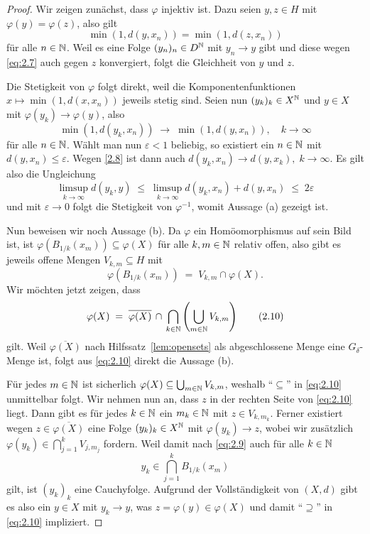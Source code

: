 \documentclass[../main/main.tex]{subfiles}
\begin{document}
	\begin{proof}
		Wir zeigen zunächst, dass $\varphi$ injektiv ist. 
		Dazu seien $y, z \in H$ mit $\varphi(y) = \varphi(z)$, also gilt
		\[\min(1, d(y, x_n)) = \min(1, d(z, x_n)) \label{eq:2.7} \tag{2.7}\]
		für alle $n \in \mathbb{N}$. Weil es eine Folge $(y_n)_n \in D^{\mathbb{N}}$ mit 
		$y_n \to y$ gibt und diese wegen \eqref{eq:2.7} auch gegen $z$ 
		konvergiert, folgt die Gleichheit von $y$ und $z$.
		
		Die Stetigkeit von $\varphi$ folgt direkt, weil die 
		Komponentenfunktionen $x \mapsto \min(1, d(x, x_n))$ jeweils stetig sind. 
		Seien nun $(y_k)_k \in X^{\mathbb{N}}$ und $y \in X$ mit $\varphi(y_k) \to \varphi(y)$, 
		also
		\[\min(1, d(y_k, x_n)) \; \to \; \min(1, d(y, x_n)), 
		\quad k \to \infty \label{2.8} \tag{2.8}\]
		für alle $n \in \mathbb{N}$. Wählt man nun $\varepsilon < 1$ beliebig, 
		so existiert ein $n \in \mathbb{N}$ mit $d(y, x_n) \leq \varepsilon$. 
		Wegen \eqref{2.8} ist dann auch
		$d(y_k, x_n) \to d(y, x_k), \; k \to \infty$. Es gilt also die Ungleichung
		$$\limsup_{k \to \infty} d(y_k, y) \; \leq \; 
		\limsup_{k \to \infty} d(y_k, x_n) + d(y, x_n) \; \leq \; 2\varepsilon$$
		und mit $\varepsilon \to 0$ folgt die Stetigkeit von $\varphi^{-1}$, 
		womit Aussage (a) gezeigt ist.
		
		Nun beweisen wir noch Aussage (b). Da $\varphi$ ein Homöomorphismus auf sein 
		Bild ist, ist $\varphi(B_{1/k}(x_m)) \subseteq \varphi(X)$ für alle 
		$k, m \in \mathbb{N}$ relativ offen, also gibt es jeweils offene Mengen 
		$V_{k, m} \subseteq H$ mit
		\[\varphi(B_{1/k}(x_m)) \; = \; V_{k, m} 
		\cap \varphi(X) \text{.} \label{eq:2.9} \tag{2.9}\]
		Wir möchten jetzt zeigen, dass
		\[\varphi(X) \; = \; \overline{\varphi(X)} \, \cap \, 
		\bigcap_{k \in \mathbb{N}} \left( \bigcup_{m \in \mathbb{N}} V_{k, m} \right) 
		\label{eq:2.10} \tag{2.10}\]
		gilt. 
		Weil $\overline{\varphi(X)}$ nach Hilfssatz~\ref{lem:opensets} 
		als abgeschlossene Menge eine $G_\delta$-Menge ist, 
		folgt aus \eqref{eq:2.10} direkt die Aussage (b).
		
		Für jedes $m \in \mathbb{N}$ ist sicherlich $\varphi(X) \subseteq 
		\bigcup_{m \in \mathbb{N}} V_{k, m}$, weshalb \enquote{$\subseteq$} 
		in \eqref{eq:2.10} unmittelbar folgt.
		Wir nehmen nun an, dass $z$ in der rechten Seite von \eqref{eq:2.10} liegt. 
		Dann gibt es für jedes $k \in \mathbb{N}$ ein $m_k \in \mathbb{N}$ mit $z \in V_{k, m_k}$. 
		Ferner existiert wegen $z \in \overline{\varphi(X)}$ eine Folge $(y_k)_k \in X^{\mathbb{N}}$ 
		mit $\varphi(y_k) \to z$, wobei wir zusätzlich
		$\varphi(y_k) \in \bigcap_{j=1}^{k} V_{j, m_j}$
		fordern. Weil damit nach \eqref{eq:2.9} auch für alle $k \in \mathbb{N}$
		\[y_k \in \bigcap_{j=1}^{k} B_{1/k}(x_m)\]
		gilt, ist $(y_k)_k$ eine Cauchyfolge. Aufgrund der Vollständigkeit von 
		$(X, d)$ gibt es also ein $y \in X$ mit $y_k \to y$, was 
		$z = \varphi(y) \in \varphi(X)$ und damit \enquote{$\supseteq$} 
		in \eqref{eq:2.10} impliziert.
	\end{proof}
\end{document}
